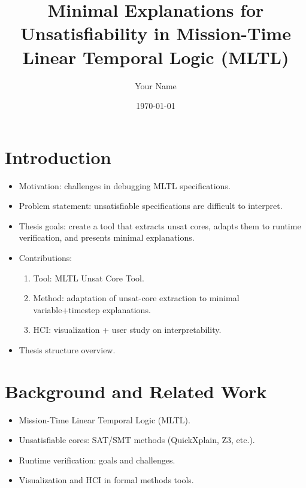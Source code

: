 \documentclass[12pt]{report}
\begin{document}
\title{Minimal Explanations for Unsatisfiability in Mission-Time Linear Temporal Logic (MLTL)}
\author{Your Name}
\date{\today}
\maketitle

\tableofcontents
\listoffigures
\listoftables


\chapter{Introduction}
\begin{itemize}
  \item Motivation: challenges in debugging MLTL specifications.
  \item Problem statement: unsatisfiable specifications are difficult to interpret.
  \item Thesis goals: create a tool that extracts unsat cores, adapts them to runtime verification, and presents minimal explanations.
  \item Contributions:
    \begin{enumerate}
      \item Tool: MLTL Unsat Core Tool.
      \item Method: adaptation of unsat-core extraction to minimal variable+timestep explanations.
      \item HCI: visualization + user study on interpretability.
    \end{enumerate}
  \item Thesis structure overview.
\end{itemize}

\chapter{Background and Related Work}
\begin{itemize}
  \item Mission-Time Linear Temporal Logic (MLTL).
  \item Unsatisfiable cores: SAT/SMT methods (QuickXplain, Z3, etc.).
  \item Runtime verification: goals and challenges.
  \item Visualization and HCI in formal methods tools.
\end{itemize}
\end{document}
